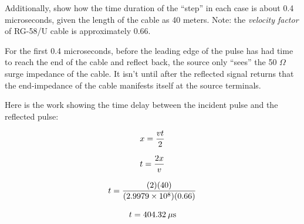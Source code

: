 \vskip 10pt

Additionally, show how the time duration of the ``step'' in each case is about 0.4 microseconds, given the length of the cable as 40 meters.  Note: the {\it velocity factor} of RG-58/U cable is approximately 0.66.







For the first 0.4 microseconds, before the leading edge of the pulse has had time to reach the end of the cable and reflect back, the source only ``sees'' the 50 $\Omega$ surge impedance of the cable.  It isn't until after the reflected signal returns that the end-impedance of the cable manifests itself at the source terminals.

\vskip 10pt

Here is the work showing the time delay between the incident pulse and the reflected pulse:

$$x = {vt \over 2}$$

$$t = {2x \over v}$$

$$t = {(2)(40) \over (2.9979 \times 10^8)(0.66)}$$

$$t = 404.32 \> \mu \hbox{s}$$












